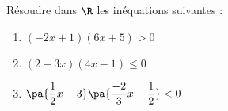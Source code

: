 \begin{exo}{}
	Résoudre dans $\R$ les inéquations suivantes :
	\begin{enumerate}[itemsep=2mm]
		\item $(-2x + 1)(6x + 5) > 0$
		\item $(2 - 3x)(4x - 1) \le 0$
		\item $\pa{\dfrac{1}{2}x + 3}\pa{\dfrac{-2}{3}x - \dfrac{1}{2}} < 0$
	\end{enumerate}
\end{exo}
